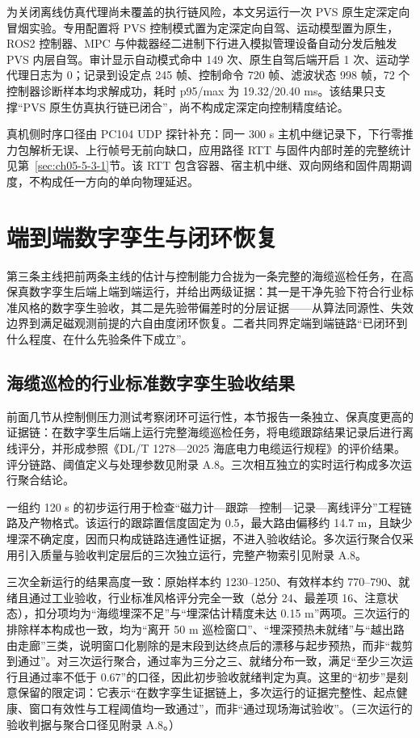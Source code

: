为关闭离线仿真代理尚未覆盖的执行链风险，本文另运行一次 PVS 原生定深定向冒烟实验。专用配置将 PVS 控制模式置为定深定向自驾、运动模型置为原生，ROS2 控制器、MPC 与仲裁器经二进制下行进入模拟管理设备自动分发后触发 PVS 内层自驾。审计显示自动模式命中 149 次、原生自驾后端开启 1 次、运动学代理日志为 0；记录到设定点 245 帧、控制命令 720 帧、滤波状态 998 帧，72 个控制器诊断样本均求解成功，耗时 p95/max 为 19.32/20.40 ms。该结果只支撑``PVS 原生仿真执行链已闭合''，尚不构成定深定向控制精度结论。

真机侧时序口径由 PC104 UDP 探针补充：同一 300 s 主机中继记录下，下行零推力包解析无误、上行帧号无前向缺口，应用路径 RTT 与固件内部时差的完整统计见第~\ref{sec:ch05-5-3-1}节。该 RTT 包含容器、宿主机中继、双向网络和固件周期调度，不构成任一方向的单向物理延迟。

\section{端到端数字孪生与闭环恢复}\label{sec:ch05-e2e}

第三条主线把前两条主线的估计与控制能力合拢为一条完整的海缆巡检任务，在高保真数字孪生后端上端到端运行，并给出两级证据：其一是干净先验下符合行业标准风格的数字孪生验收，其二是先验带偏差时的分层证据——从算法同源性、失效边界到满足磁观测前提的六自由度闭环恢复。二者共同界定端到端链路``已闭环到什么程度、在什么先验条件下成立''。

\subsection{海缆巡检的行业标准数字孪生验收结果}\label{sec:ch05-5-5-10}

前面几节从控制侧压力测试考察闭环可运行性，本节报告一条独立、保真度更高的证据链：在数字孪生后端上运行完整海缆巡检任务，将电缆跟踪结果记录后进行离线评分，并形成参照《DL/T 1278---2025 海底电力电缆运行规程》\cite{dlt1278_2025}的评价结果。评分链路、阈值定义与处理参数见附录 A.8。三次相互独立的实时运行构成多次运行聚合结论。

一组约 120 s 的初步运行用于检查``磁力计—跟踪—控制—记录—离线评分''工程链路及产物格式。该运行的跟踪置信度固定为 0.5，最大路由偏移约 14.7 m，且缺少埋深不确定度，因而只构成链路连通性证据，不进入验收结论。多次运行聚合仅采用引入质量与验收判定层后的三次独立运行，完整产物索引见附录 A.8。

三次全新运行的结果高度一致：原始样本约 1230--1250、有效样本约 770--790、就绪且通过工业验收，行业标准风格评分完全一致（总分 24、最差项 16、注意状态），扣分项均为``海缆埋深不足''与``埋深估计精度未达 0.15 m''两项。三次运行的排除样本构成也一致，均为``离开 50 m 巡检窗口''、``埋深预热未就绪''与``越出路由走廊''三类，说明窗口化剔除的是末段到达终点后的漂移与起步预热，而非``裁剪到通过''。对三次运行聚合，通过率为三分之三、就绪分布一致，满足``至少三次运行且通过率不低于 0.67''的口径，因此初步验收就绪判定为真。这里的``初步''是刻意保留的限定词：它表示``在数字孪生证据链上，多次运行的证据完整性、起点健康、窗口有效性与工程阈值均一致通过''，而非``通过现场海试验收''。（三次运行的验收判据与聚合口径见附录 A.8。）

